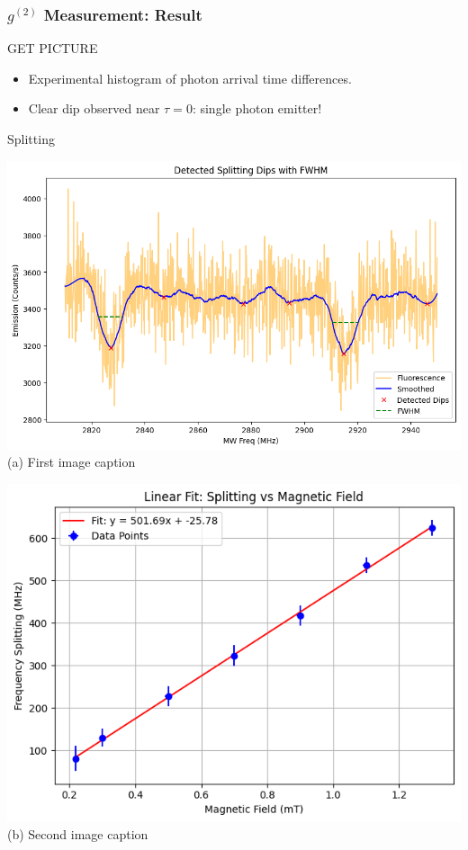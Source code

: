 \documentclass{beamer}
\begin{document}
\begin{frame}
\frametitle{$g^{(2)}$ Measurement: Result}
GET PICTURE
\begin{itemize}
    \item Experimental histogram of photon arrival time differences.
    \item Clear dip observed near $\tau = 0$: single photon emitter!
\end{itemize}
\end{frame}
\begin{frame}{Splitting}
    \begin{minipage}{0.48\textwidth}
        \centering
        \includegraphics[width=\linewidth]{presentation/figs/dips.png}
        {\small(a) First image caption}
    \end{minipage}
    \hfill
    \begin{minipage}{0.48\textwidth}
        \centering
        \includegraphics[width=\linewidth]{presentation/figs/split_vs_field.png}
        {\small(b) Second image caption}
    \end{minipage}
\end{frame}
\end{document}
